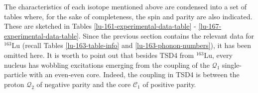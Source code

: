 The characteristics of each isotope mentioned above are condensed into a set of tables where, for the sake of completeness, the spin and parity are also indicated. These are sketched in Tables \ref{lu-161-experimental-data-table} - \ref{lu-167-experimental-data-table}. Since the previous section contains the relevant data for $^{163}$Lu (recall Tables \ref{lu-163-table-info} and \ref{lu-163-phonon-numbers}), it has been omitted here. It is worth to point out that besides TSD4 from $^{163}$Lu, every nucleus has wobbling excitations emerging from the coupling of the $\mathcal{Q}_1$ single-particle with an even-even core. Indeed, the coupling in TSD4 is between the proton $\mathcal{Q}_2$ of negative parity and the core $\mathscr{C}_1$ of positive parity.
\begin{table}
    \centering
    \caption{Spin and parity assignments for $^{161}$Lu, which are required for the excitation energy calculations (first column). The single-particle and the core states are shown in the third and fourth column. The wobbling phonon numbers from Eq. \ref{phononic-term-tsd-energies} are shown in the penultimate column. The band-head $I_b$ of this isotope is also given in the last column.}
    \label{lu-161-experimental-data-table}
\end{table}
